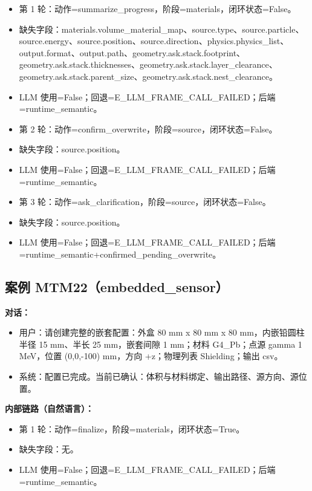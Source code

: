 \documentclass[11pt]{ctexart}
\begin{document}
\begin{itemize}
\item 第 1 轮：动作=summarize\_progress，阶段=materials，闭环状态=False。
\item 缺失字段：materials.volume\_material\_map、source.type、source.particle、source.energy、source.position、source.direction、physics.physics\_list、output.format、output.path、geometry.ask.stack.footprint、geometry.ask.stack.thicknesses、geometry.ask.stack.layer\_clearance、geometry.ask.stack.parent\_size、geometry.ask.stack.nest\_clearance。
\item LLM 使用=False；回退=E\_LLM\_FRAME\_CALL\_FAILED；后端=runtime\_semantic。
\item 第 2 轮：动作=confirm\_overwrite，阶段=source，闭环状态=False。
\item 缺失字段：source.position。
\item LLM 使用=False；回退=E\_LLM\_FRAME\_CALL\_FAILED；后端=runtime\_semantic。
\item 第 3 轮：动作=ask\_clarification，阶段=source，闭环状态=False。
\item 缺失字段：source.position。
\item LLM 使用=False；回退=E\_LLM\_FRAME\_CALL\_FAILED；后端=runtime\_semantic+confirmed\_pending\_overwrite。
\end{itemize}
\subsection{案例 MTM22（embedded\_sensor）}
\textbf{对话：}
\begin{itemize}
\item 用户：请创建完整的嵌套配置：外盒 80 mm x 80 mm x 80 mm，内嵌铅圆柱半径 15 mm、半长 25 mm，嵌套间隙 1 mm；材料 G4\_Pb；点源 gamma 1 MeV，位置 (0,0,-100) mm，方向 +z；物理列表 Shielding；输出 csv。
\item 系统：配置已完成。当前已确认：体积与材料绑定、输出路径、源方向、源位置。
\end{itemize}
\textbf{内部链路（自然语言）：}
\begin{itemize}
\item 第 1 轮：动作=finalize，阶段=materials，闭环状态=True。
\item 缺失字段：无。
\item LLM 使用=False；回退=E\_LLM\_FRAME\_CALL\_FAILED；后端=runtime\_semantic。
\end{itemize}
\end{document}
